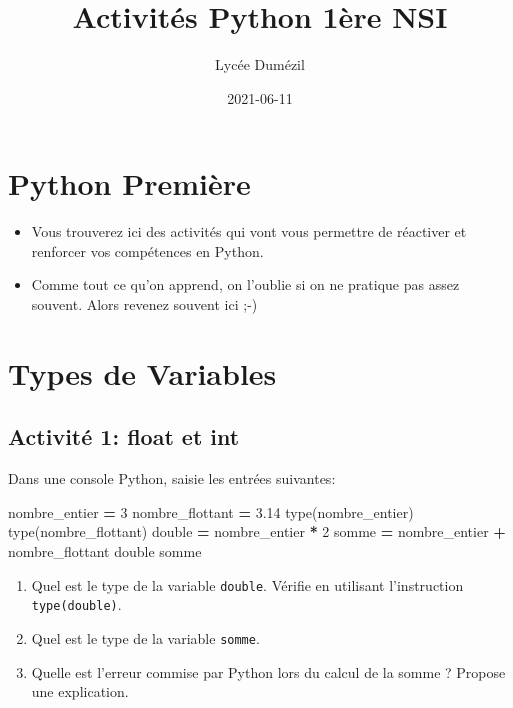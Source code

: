 \documentclass[
]{book}
\title{Activités Python 1ère NSI}
\author{Lycée Dumézil}
\date{2021-06-11}
\newenvironment{Shaded}{\begin{snugshade}}{\end{snugshade}}
\newcommand{\BuiltInTok}[1]{#1}
\newcommand{\DecValTok}[1]{\textcolor[rgb]{0.00,0.00,0.81}{#1}}
\newcommand{\FloatTok}[1]{\textcolor[rgb]{0.00,0.00,0.81}{#1}}
\newcommand{\NormalTok}[1]{#1}
\newcommand{\OperatorTok}[1]{\textcolor[rgb]{0.81,0.36,0.00}{\textbf{#1}}}
\providecommand{\tightlist}{%
  \setlength{\itemsep}{0pt}\setlength{\parskip}{0pt}}
\def\tightlist{}
\begin{document}
\maketitle

{
\setcounter{tocdepth}{1}
\tableofcontents
}
\hypertarget{python-premiuxe8re}{%
\chapter*{Python Première}\label{python-premiuxe8re}}

\begin{itemize}
\tightlist
\item
  Vous trouverez ici des activités qui vont vous permettre de réactiver et renforcer vos compétences en Python.
\item
  Comme tout ce qu'on apprend, on l'oublie si on ne pratique pas assez souvent. Alors revenez souvent ici ;-)
\end{itemize}

\hypertarget{types-de-variables}{%
\chapter{Types de Variables}\label{types-de-variables}}

\hypertarget{activituxe9-1-float-et-int}{%
\section{Activité 1: float et int}\label{activituxe9-1-float-et-int}}

Dans une console Python, saisie les entrées suivantes:

\begin{Shaded}
\begin{Highlighting}[]
\NormalTok{nombre\_entier }\OperatorTok{=} \DecValTok{3} 
\NormalTok{nombre\_flottant }\OperatorTok{=} \FloatTok{3.14}
\BuiltInTok{type}\NormalTok{(nombre\_entier)}
\BuiltInTok{type}\NormalTok{(nombre\_flottant)}
\NormalTok{double }\OperatorTok{=}\NormalTok{ nombre\_entier }\OperatorTok{*} \DecValTok{2}
\NormalTok{somme }\OperatorTok{=}\NormalTok{ nombre\_entier }\OperatorTok{+}\NormalTok{ nombre\_flottant}
\NormalTok{double}
\NormalTok{somme}
\end{Highlighting}
\end{Shaded}

\begin{enumerate}
\def\labelenumi{\arabic{enumi}.}
\tightlist
\item
  Quel est le type de la variable \texttt{double}. Vérifie en utilisant l'instruction \texttt{type(double)}.
\item
  Quel est le type de la variable \texttt{somme}.
\item
  Quelle est l'erreur commise par Python lors du calcul de la somme ? Propose une explication.
\end{enumerate}
\end{document}
